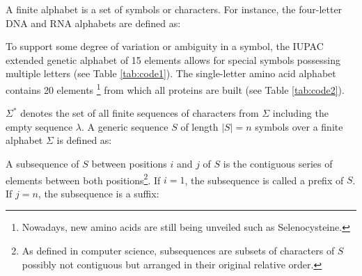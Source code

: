 A finite alphabet 
is a set of symbols or characters. For instance, the four-letter DNA and RNA 
alphabets are defined as:
\begin{center}
\end{center}
To support some degree of variation or ambiguity in a symbol, the IUPAC extended genetic alphabet 
of 15 elements allows for special symbols possessing multiple letters (see Table \ref{tab:code1}).
The single-letter amino acid alphabet contains 20 elements \footnote{Nowadays, new amino acids are
still being unveiled such as Selenocysteine.} from which all proteins are built (see Table 
\ref{tab:code2}).

$\Sigma^*$ denotes the set of all finite sequences of characters from $\Sigma$ including the empty 
sequence $\lambda$. A generic sequence $S$ of length $|S|=n$ symbols over a finite alphabet $\Sigma$ is 
defined as:
\begin{center}
\end{center}

A subsequence of $S$ between positions $i$ and $j$ of $S$ is the contiguous series of elements between 
both positions\footnote{As defined in computer science, subsequences are subsets of characters of $S$
possibly not contiguous but arranged in their original relative order.}. If $i = 1$, the subsequence is called a 
prefix of $S$. If $j = n$, the subsequence is a suffix:
\begin{center}
\end{center}


